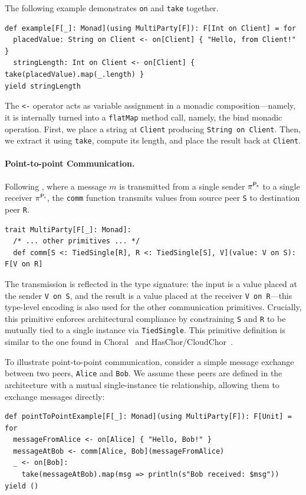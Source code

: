 \documentclass[runningheads]{llncs}
\newcommand{\code}[1]{\lstinline[style=scala3,basicstyle=\ttfamily\small\color{vscLightText}]{#1}}
\newcommand{\diff}[1]{{#1}}
\begin{document}
The following example demonstrates \code{on} and \code{take} together.
\begin{lstlisting}[style=scala3]
def example[F[_]: Monad](using MultiParty[F]): F[Int on Client] = for
  placedValue: String on Client <- on[Client] { "Hello, from Client!" }
  stringLength: Int on Client <- on[Client] { take(placedValue).map(_.length) }
yield stringLength
\end{lstlisting}
The \code{<-} operator acts as variable assignment in a monadic composition---namely, it is internally turned into a \code{flatMap} method call, namely, the bind monadic operation.
First, we place a string at \code{Client} producing \code{String on Client}.
Then, we extract it using \code{take}, compute its length, and place the result back at \code{Client}.

\paragraph{Point-to-point Communication.}
Following , where a message $m$ is transmitted from a single sender $\mathsf{\pi_{}^{P_s}}$ to a single receiver $\mathsf{\pi_{}^{P_r}}$,
the \code{comm} function transmits values from source peer \code{S} to destination peer \code{R}.
\begin{lstlisting}[style=scala3]
trait MultiParty[F[_]: Monad]:
  /* ... other primitives ... */
  def comm[S <: TiedSingle[R], R <: TiedSingle[S], V](value: V on S): F[V on R]
\end{lstlisting}
The transmission is reflected in the type signature:
the input is a value placed at the sender \code{V on S}, and the result is a value placed at the receiver \code{V on R}---this type-level encoding is also used for the other communication primitives.
Crucially, this primitive enforces architectural compliance by constraining \code{S} and \code{R}
to be mutually tied to a single instance via \code{TiedSingle}.
\diff{
This primitive definition is similar to the one found in Choral~\cite{10.1145/3632398} and HasChor/CloudChor~\cite{10.1145/3607849}.}

To illustrate point-to-point communication,
consider a simple message exchange between two peers, \code{Alice} and \code{Bob}.
We assume these peers are defined in the architecture with a mutual single-instance tie relationship,
allowing them to exchange messages directly:
\begin{lstlisting}[style=scala3]
def pointToPointExample[F[_]: Monad](using MultiParty[F]): F[Unit] = for
  messageFromAlice <- on[Alice] { "Hello, Bob!" }
  messageAtBob <- comm[Alice, Bob](messageFromAlice)
  _ <- on[Bob]:
    take(messageAtBob).map(msg => println(s"Bob received: $msg"))
yield ()
\end{lstlisting}
\end{document}
